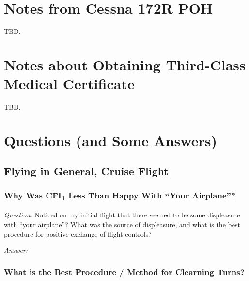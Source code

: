 \documentclass[letterpaper,10pt,titlepage]{article}
\begin{document}

\section{Notes from Cessna 172R POH}
\label{snrc0}

TBD.



\section{Notes about Obtaining Third-Class Medical Certificate}
\label{stcm0}

TBD.


\section{Questions (and Some Answers)}
\label{sqsa0}



\subsection{Flying in General, Cruise Flight}
\label{sqsa0:sfig0}


\subsubsection{Why Was CFI\textsubscript{1} Less Than Happy With ``Your Airplane''?}
\label{sqsa0:sfig0:slhy0}

\emph{Question:} Noticed on my initial flight that there seemed to be some
displeasure with ``your airplane''?  What was the source of displeasure, and what
is the best procedure for positive exchange of flight controls?

\noindent{}\emph{Answer:}


\subsubsection{What is the Best Procedure / Method for Clearning Turns?}
\label{sqsa0:sfig0:sclt0}
\end{document}
